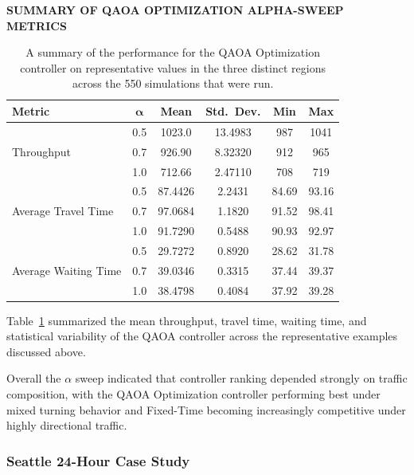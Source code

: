 \documentclass[12pt]{article}
\begin{document}
\begin{table}[H]
\centering
\textbf{\textsc{SUMMARY OF QAOA OPTIMIZATION ALPHA-SWEEP METRICS}}

\vspace{0.3cm}

\begin{tabular}{@{} l c c c c c @{}}
\toprule
\textbf{Metric} & $\boldsymbol{\alpha}$ & \textbf{Mean} & \textbf{Std.\ Dev.} & \textbf{Min} & \textbf{Max} \\
\midrule
\multirow{3}{*}{Throughput}
  & 0.5 & 1023.0 & 13.4983 & 987 & 1041 \\
  & 0.7 & 926.90 & 8.32320 & 912 &  965 \\
  & 1.0 & 712.66 & 2.47110 & 708 &  719 \\

\multirow{3}{*}{Average Travel Time}
  & 0.5 &	87.4426 & 2.2431 &	84.69 &	93.16 \\
  & 0.7 &	97.0684	& 1.1820 &	91.52 &	98.41 \\
  & 1.0 &	91.7290	& 0.5488 &	90.93 &	92.97 \\

\multirow{3}{*}{Average Waiting Time}
  & 0.5 &	29.7272 & 	0.8920 &	28.62 &	31.78 \\
  & 0.7 &	39.0346 &	0.3315 &	37.44 &	39.37 \\
  & 1.0 &	38.4798 &	0.4084 &	37.92 &	39.28 \\
\bottomrule
\end{tabular}
\caption{A summary of the performance for the QAOA Optimization controller on representative values in the three distinct regions across the 550 simulations that were run.}
\label{tab:qaoa-alpha-summary}
\end{table}

Table~\ref{tab:qaoa-alpha-summary} summarized the mean throughput, travel time, waiting time, and statistical variability of the QAOA controller across the representative examples discussed above.

Overall the $\alpha$ sweep indicated that controller ranking depended strongly on traffic composition, with the QAOA Optimization controller performing best under mixed turning behavior and Fixed-Time becoming increasingly competitive under highly directional traffic.

\subsubsection{Seattle 24-Hour Case Study}
\end{document}
